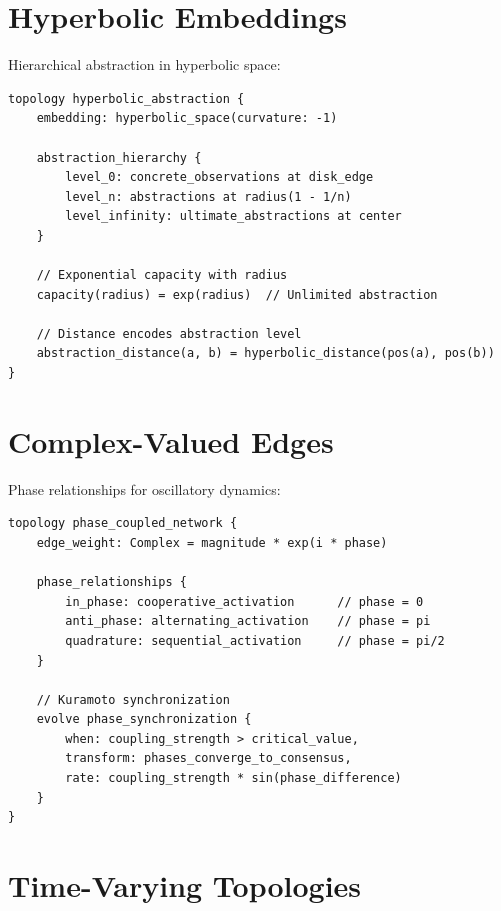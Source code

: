 \documentclass[12pt,a4paper,openany]{book} %
\begin{document}
\section{Hyperbolic Embeddings}

Hierarchical abstraction in hyperbolic space:

\vspace{0.5em}
\begin{lstlisting}[language=loom]
topology hyperbolic_abstraction {
    embedding: hyperbolic_space(curvature: -1)

    abstraction_hierarchy {
        level_0: concrete_observations at disk_edge
        level_n: abstractions at radius(1 - 1/n)
        level_infinity: ultimate_abstractions at center
    }

    // Exponential capacity with radius
    capacity(radius) = exp(radius)  // Unlimited abstraction

    // Distance encodes abstraction level
    abstraction_distance(a, b) = hyperbolic_distance(pos(a), pos(b))
}
\end{lstlisting}
\vspace{0.5em}

\section{Complex-Valued Edges}

Phase relationships for oscillatory dynamics:

\vspace{0.5em}
\begin{lstlisting}[language=loom]
topology phase_coupled_network {
    edge_weight: Complex = magnitude * exp(i * phase)

    phase_relationships {
        in_phase: cooperative_activation      // phase = 0
        anti_phase: alternating_activation    // phase = pi
        quadrature: sequential_activation     // phase = pi/2
    }

    // Kuramoto synchronization
    evolve phase_synchronization {
        when: coupling_strength > critical_value,
        transform: phases_converge_to_consensus,
        rate: coupling_strength * sin(phase_difference)
    }
}
\end{lstlisting}
\vspace{0.5em}

\section{Time-Varying Topologies}
\end{document}

